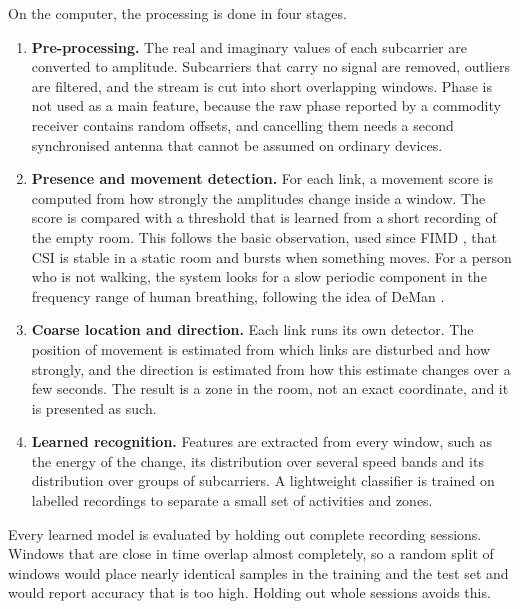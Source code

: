 On the computer, the processing is done in four stages.
\begin{enumerate}
  \item \textbf{Pre-processing.} The real and imaginary values of each subcarrier are converted to amplitude. Subcarriers that carry no signal are removed, outliers are filtered, and the stream is cut into short overlapping windows. Phase is not used as a main feature, because the raw phase reported by a commodity receiver contains random offsets, and cancelling them needs a second synchronised antenna that cannot be assumed on ordinary devices.
  \item \textbf{Presence and movement detection.} For each link, a movement score is computed from how strongly the amplitudes change inside a window. The score is compared with a threshold that is learned from a short recording of the empty room. This follows the basic observation, used since FIMD \cite{fimd}, that CSI is stable in a static room and bursts when something moves. For a person who is not walking, the system looks for a slow periodic component in the frequency range of human breathing, following the idea of DeMan \cite{deman}.
  \item \textbf{Coarse location and direction.} Each link runs its own detector. The position of movement is estimated from which links are disturbed and how strongly, and the direction is estimated from how this estimate changes over a few seconds. The result is a zone in the room, not an exact coordinate, and it is presented as such.
  \item \textbf{Learned recognition.} Features are extracted from every window, such as the energy of the change, its distribution over several speed bands and its distribution over groups of subcarriers. A lightweight classifier is trained on labelled recordings to separate a small set of activities and zones.
\end{enumerate}

Every learned model is evaluated by holding out complete recording sessions. Windows that are close in time overlap almost completely, so a random split of windows would place nearly identical samples in the training and the test set and would report accuracy that is too high. Holding out whole sessions avoids this.
